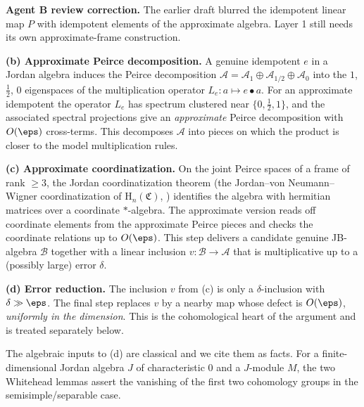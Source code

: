 \smallskip\noindent\textbf{Agent B review correction.}
The earlier draft blurred the idempotent linear map $P$ with idempotent elements
of the approximate algebra. Layer 1 still needs its own approximate-frame
construction.

\medskip
\noindent\textbf{(b) Approximate Peirce decomposition.}
A genuine idempotent $e$ in a Jordan algebra induces the Peirce decomposition
$\mathcal{A}=\mathcal{A}_{1}\oplus\mathcal{A}_{1/2}\oplus\mathcal{A}_{0}$ into
the $1$, $\tfrac12$, $0$ eigenspaces of the multiplication operator
$L_{e}\colon a\mapsto e\bullet a$. For an approximate idempotent the operator
$L_{e}$ has spectrum clustered near $\{0,\tfrac12,1\}$, and the associated
spectral projections give an \emph{approximate} Peirce decomposition with
$O(\eps)$ cross-terms. This decomposes $\mathcal{A}$ into pieces on which the
product is closer to the model multiplication rules.

\medskip
\noindent\textbf{(c) Approximate coordinatization.}
On the joint Peirce spaces of a frame of rank $\ge 3$, the Jordan
coordinatization theorem (the Jordan--von Neumann--Wigner coordinatization of
$\mathrm{H}_{n}(\mathfrak{C})$, \cite{JordanVonNeumannWigner1934}) identifies
the algebra with hermitian matrices over a coordinate $*$-algebra. The
approximate version reads off coordinate elements from the approximate Peirce
pieces and checks the coordinate relations up to $O(\eps)$. This step delivers a
candidate genuine JB-algebra $\mathcal{B}$ together with a linear inclusion
$v\colon\mathcal{B}\to\mathcal{A}$ that is multiplicative up to a (possibly
large) error $\delta$.

\medskip
\noindent\textbf{(d) Error reduction.}
The inclusion $v$ from (c) is only a $\delta$-inclusion with $\delta\gg\eps$.
The final step replaces $v$ by a nearby map whose defect is $O(\eps)$,
\emph{uniformly in the dimension}. This is the cohomological heart of the
argument and is treated separately below.

The algebraic inputs to (d) are classical and we cite them as facts. For a
finite-dimensional Jordan algebra $J$ of characteristic $0$ and a $J$-module
$M$, the two Whitehead lemmas assert the vanishing of the first two cohomology
groups in the semisimple/separable case.


